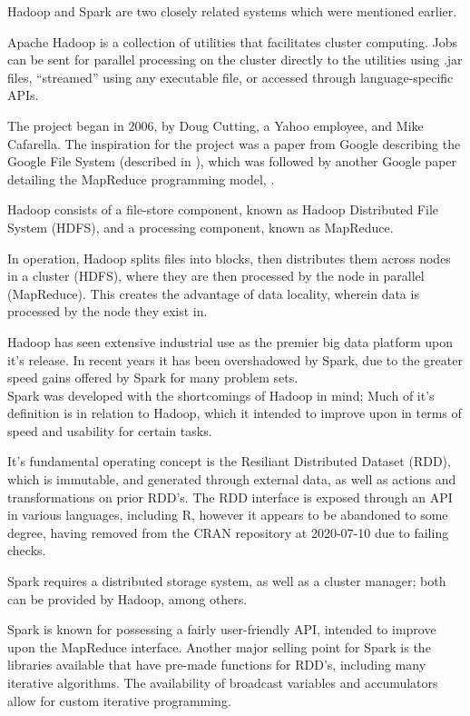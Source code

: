 Hadoop and Spark are two closely related systems which were mentioned earlier.

Apache Hadoop is a collection of utilities that facilitates cluster computing. 
Jobs can be sent for parallel processing on the cluster directly to the utilities using .jar files, ``streamed'' using any executable file, or accessed through language-specific APIs.

The project began in 2006, by Doug Cutting, a Yahoo employee, and Mike Cafarella. 
The inspiration for the project was a paper from Google describing the Google File System (described in \textcite{ghemawat2003google}), which was followed by another Google paper detailing the MapReduce programming model, \textcite{dean2004mapreduce}.

Hadoop consists of a file-store component, known as Hadoop Distributed File System (HDFS), and a processing component, known as MapReduce.

In operation, Hadoop splits files into blocks, then distributes them across nodes in a cluster (HDFS), where they are then processed by the node in parallel (MapReduce).
This creates the advantage of data locality, wherein data is processed by the node they exist in.

Hadoop has seen extensive industrial use as the premier big data platform upon it's release. 
In recent years it has been overshadowed by Spark, due to the greater speed gains offered by Spark for many problem sets.\\

Spark was developed with the shortcomings of Hadoop in mind;  Much of it's definition is in relation to Hadoop, which it intended to improve upon in terms of speed and usability for certain tasks\cite{zaharia2010spark}.

It's fundamental operating concept is the Resiliant Distributed Dataset (RDD), which is immutable, and generated through external data, as well as actions and transformations on prior RDD's. 
The RDD interface is exposed through an API in various languages, including R, however it appears to be abandoned to some degree, having removed from the CRAN repository at 2020-07-10 due to failing checks.

Spark requires a distributed storage system, as well as a cluster manager; both can be provided by Hadoop, among others.

Spark is known for possessing a fairly user-friendly API, intended to improve upon the MapReduce interface. 
Another major selling point for Spark is the libraries available that have pre-made functions for RDD's, including many iterative algorithms. 
The availability of broadcast variables and accumulators allow for custom iterative programming.

